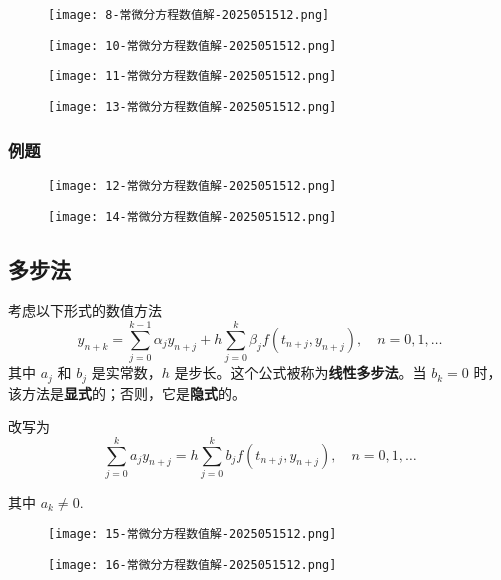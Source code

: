 \begin{figure}[H]
\centering
\texttt{[image: 8-常微分方程数值解-2025051512.png]}
\label{}
\end{figure}
\begin{figure}[H]
\centering
\texttt{[image: 10-常微分方程数值解-2025051512.png]}
\label{}
\end{figure}

\begin{figure}[H]
\centering
\texttt{[image: 11-常微分方程数值解-2025051512.png]}
\label{}
\end{figure}

\begin{figure}[H]
\centering
\texttt{[image: 13-常微分方程数值解-2025051512.png]}
\label{}
\end{figure}

\subsubsection{例题}

\begin{figure}[H]
\centering
\texttt{[image: 12-常微分方程数值解-2025051512.png]}
\label{}
\end{figure}
\begin{figure}[H]
\centering
\texttt{[image: 14-常微分方程数值解-2025051512.png]}
\label{}
\end{figure}

\subsection{多步法}

考虑以下形式的数值方法
\[
y_{n+k}=\sum_{j=0}^{k-1} \alpha_j y_{n+j}+h \sum_{j=0}^k \beta_j f\left(t_{n+j}, y_{n+j}\right), \quad n=0,1, \ldots
\]
其中 $a_j$ 和 $b_j$ 是实常数，$h$ 是步长。这个公式被称为\textbf{线性多步法}。当 $b_k=0$ 时，该方法是\textbf{显式}的；否则，它是\textbf{隐式}的。

改写为
\begin{equation}
\sum_{j=0}^{k} a_j y_{n+j}=h \sum_{j=0}^k b_j f\left(t_{n+j}, y_{n+j}\right), \quad n=0,1, \ldots
\label{7fcebc}
\end{equation}

其中 $a_k\neq0$.

\begin{figure}[H]
\centering
\texttt{[image: 15-常微分方程数值解-2025051512.png]}
\label{}
\end{figure}
\begin{figure}[H]
\centering
\texttt{[image: 16-常微分方程数值解-2025051512.png]}
\label{}
\end{figure}

